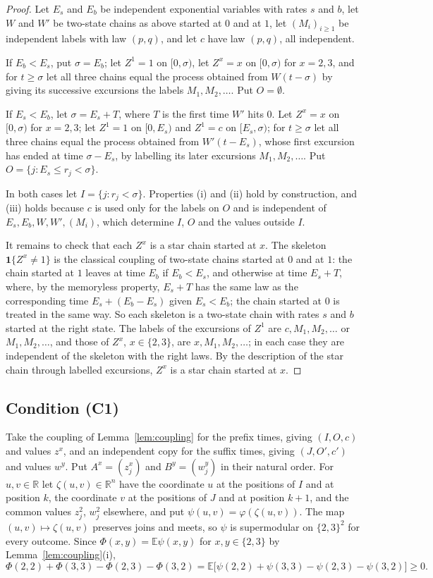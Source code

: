 \documentclass[11pt]{amsart}
\theoremstyle{remark}
\numberwithin{equation}{section}
\newcommand{\E}{\mathbb E}
\newcommand{\R}{\mathbb R}
\newcommand{\1}{\mathbf 1}
\begin{document}
\begin{proof}
Let $E_s$ and $E_b$ be independent exponential variables with rates $s$ and $b$, let $W$ and $W'$ be two-state chains as above started at $0$ and at $1$, let $(M_i)_{i\ge1}$ be independent labels with law $(p,q)$, and let $c$ have law $(p,q)$, all independent.

If $E_b<E_s$, put $\sigma=E_b$; let $Z^1=1$ on $[0,\sigma)$, let $Z^x=x$ on $[0,\sigma)$ for $x=2,3$, and for $t\ge\sigma$ let all three chains equal the process obtained from $W(t-\sigma)$ by giving its successive excursions the labels $M_1,M_2,\dots$. Put $O=\emptyset$.

If $E_s<E_b$, let $\sigma=E_s+T$, where $T$ is the first time $W'$ hits $0$. Let $Z^x=x$ on $[0,\sigma)$ for $x=2,3$; let $Z^1=1$ on $[0,E_s)$ and $Z^1=c$ on $[E_s,\sigma)$; for $t\ge\sigma$ let all three chains equal the process obtained from $W'(t-E_s)$, whose first excursion has ended at time $\sigma-E_s$, by labelling its later excursions $M_1,M_2,\dots$. Put $O=\{j:E_s\le r_j<\sigma\}$.

In both cases let $I=\{j:r_j<\sigma\}$. Properties (i) and (ii) hold by construction, and (iii) holds because $c$ is used only for the labels on $O$ and is independent of $E_s,E_b,W,W',(M_i)$, which determine $I$, $O$ and the values outside $I$.

It remains to check that each $Z^x$ is a star chain started at $x$. The skeleton $\1\{Z^x\ne1\}$ is the classical coupling of two-state chains started at $0$ and at $1$: the chain started at $1$ leaves at time $E_b$ if $E_b<E_s$, and otherwise at time $E_s+T$, where, by the memoryless property, $E_s+T$ has the same law as the corresponding time $E_s+(E_b-E_s)$ given $E_s<E_b$; the chain started at $0$ is treated in the same way. So each skeleton is a two-state chain with rates $s$ and $b$ started at the right state. The labels of the excursions of $Z^1$ are $c,M_1,M_2,\dots$ or $M_1,M_2,\dots$, and those of $Z^x$, $x\in\{2,3\}$, are $x,M_1,M_2,\dots$; in each case they are independent of the skeleton with the right laws. By the description of the star chain through labelled excursions, $Z^x$ is a star chain started at $x$.
\end{proof}

\subsection{Condition (C1)}
Take the coupling of Lemma~\ref{lem:coupling} for the prefix times, giving $(I,O,c)$ and values $z^x$, and an independent copy for the suffix times, giving $(J,O',c')$ and values $w^y$. Put $A^x=(z^x_j)$ and $B^y=(w^y_j)$ in their natural order. For $u,v\in\R$ let $\zeta(u,v)\in\R^n$ have the coordinate $u$ at the positions of $I$ and at position $k$, the coordinate $v$ at the positions of $J$ and at position $k+1$, and the common values $z^2_j$, $w^2_j$ elsewhere, and put $\psi(u,v)=\varphi(\zeta(u,v))$. The map $(u,v)\mapsto\zeta(u,v)$ preserves joins and meets, so $\psi$ is supermodular on $\{2,3\}^2$ for every outcome. Since $\Phi(x,y)=\E\psi(x,y)$ for $x,y\in\{2,3\}$ by Lemma~\ref{lem:coupling}(i),
\[
\Phi(2,2)+\Phi(3,3)-\Phi(2,3)-\Phi(3,2)=\E\bigl[\psi(2,2)+\psi(3,3)-\psi(2,3)-\psi(3,2)\bigr]\ge0.
\]
\end{document}
